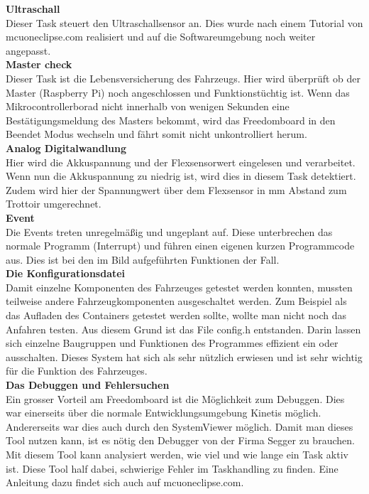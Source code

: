 \textbf{Ultraschall}\\[0.2cm]
Dieser Task steuert den Ultraschallsensor an. Dies wurde nach einem Tutorial von mcuoneclipse.com realisiert und auf die Softwareumgebung noch weiter angepasst.\\[0.2cm]
\textbf{Master check}\\[0.2cm]
Dieser Task ist die Lebensversicherung des Fahrzeugs. Hier wird überprüft ob der Master (Raspberry Pi) noch angeschlossen und Funktionstüchtig ist. Wenn das Mikrocontrollerborad nicht innerhalb von wenigen Sekunden eine Bestätigungsmeldung des Masters bekommt, wird das Freedomboard in den Beendet Modus wechseln und fährt somit nicht unkontrolliert herum. \\[0.2cm]
\textbf{Analog Digitalwandlung}\\[0.2cm]
Hier wird die Akkuspannung und der Flexsensorwert eingelesen und verarbeitet. Wenn nun die Akkuspannung zu niedrig ist, wird dies in diesem Task detektiert. Zudem wird hier der Spannungwert über dem Flexsensor in mm Abstand zum Trottoir umgerechnet.\\[0.2cm]
\textbf{Event}\\[0.2cm]
Die Events treten unregelmäßig und ungeplant auf. Diese unterbrechen das normale Programm (Interrupt) und führen einen eigenen kurzen Programmcode aus. Dies ist bei den im Bild aufgeführten Funktionen der Fall.\\[0.2cm]
\textbf{Die Konfigurationsdatei}\\[0.2cm]
Damit einzelne Komponenten des Fahrzeuges getestet werden konnten, mussten teilweise andere Fahrzeugkomponenten ausgeschaltet werden. Zum Beispiel als das Aufladen des Containers getestet werden sollte, wollte man nicht noch das Anfahren testen. Aus diesem Grund ist das File config.h entstanden. Darin lassen sich einzelne Baugruppen und Funktionen des Programmes effizient ein oder ausschalten. Dieses System hat sich als sehr nützlich erwiesen und ist sehr wichtig für die Funktion des Fahrzeuges.\\[0.2cm]
\textbf{Das Debuggen und Fehlersuchen}\\[0.2cm]
Ein grosser Vorteil am Freedomboard ist die Möglichkeit zum Debuggen. Dies war einerseits über die normale Entwicklungsumgebung Kinetis möglich. Andererseits war dies auch durch den SystemViewer möglich. Damit man dieses Tool nutzen kann, ist es nötig den Debugger von der Firma Segger zu brauchen. Mit diesem Tool kann analysiert werden, wie viel und wie lange ein Task aktiv ist. Diese Tool half dabei, schwierige Fehler im Taskhandling zu finden. Eine Anleitung dazu findet sich auch auf mcuoneclipse.com.\\[0.2cm]
